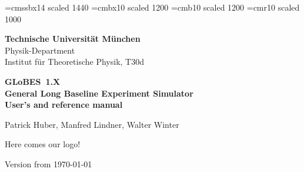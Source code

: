 \documentclass[a4paper,12pt,twoside]{book}
\newcommand{\GLOBES}{{\sf GLoBES}}
\begin{document}
 

\thispagestyle{empty}
{
\setlength{\parindent}{0cm}


\font\fa=cmssbx14 scaled 1440
\font\fb=cmbx10 scaled 1200
\font\fc=cmb10 scaled 1200
\font\fd=cmr10 scaled 1000  

{\setlength{\baselineskip}{1.2cm}}



\begin{minipage}{7cm}
\begin{center}
{\bf Technische Universit{\"a}t M{\"u}nchen} \\
Physik-Department \\
Institut f{\"u}r Theoretische Physik, T30d \\
\end{center}
\end{minipage}

\vspace{-2cm}

\hfill \oTUM{3.5cm}

\vspace{3cm}

\begin{center}
{ \Large \bf
\GLOBES\ 1.X \\
General Long Baseline Experiment Simulator \\ }
\vspace*{0.5cm}
{\large \bf User's and reference manual }
\end{center}

\vspace{1cm}

\begin{center}
{\large Patrick Huber, Manfred Lindner, Walter Winter}
\end{center}

\vspace{1cm}

\begin{center}
Here comes our logo!
\end{center}

\vspace{1cm}

\begin{center}
Version from \today
\end{center}



}
\end{document}
